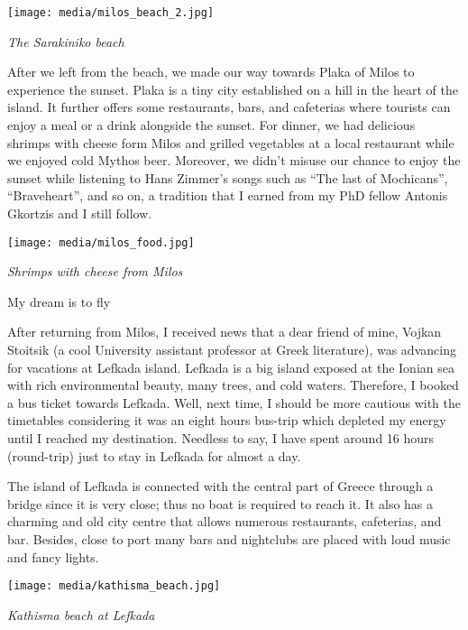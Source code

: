 \documentclass[10pt,a4paper]{article} %
\newcommand{\NewsItem}[1]{ %
\usefont{T1}{fvs}{n}{n} %
\vspace{24pt}\large #1\vspace{3pt} %
\par \normalsize \normalfont}
\begin{document}
\begin{multicols}{3}
\begin{center}
	\texttt{[image: media/milos\_beach\_2.jpg]}
	\par\textit{The Sarakiniko beach}
\end{center} 

After we left from the beach, we made our way towards Plaka of Milos
to experience the sunset. 
Plaka is a tiny city established on a hill in the heart of the island. 
It further offers some restaurants, bars, and cafeterias
where tourists can enjoy a meal or a drink alongside the sunset. 
For dinner, we had delicious shrimps with cheese form Milos
and grilled vegetables at a local restaurant while we enjoyed cold Mythos beer. 
Moreover, we didn't misuse our chance to enjoy the sunset
while listening to Hans Zimmer's songs such as ``The last of Mochicans'',
``Braveheart'', and so on,
a tradition that I earned from my PhD fellow Antonis Gkortzis and I still follow.

\begin{center}
	\texttt{[image: media/milos\_food.jpg]}
	\par\textit{Shrimps with cheese from Milos}
\end{center}

\NewsItem{My dream is to fly}
After returning from Milos, I received news that a dear friend of mine,
Vojkan Stoitsik (a cool University assistant professor at Greek literature),
was advancing for vacations at Lefkada island. 
Lefkada is a big island exposed at the Ionian sea with rich environmental beauty,
many trees, and cold waters.
Therefore, I booked a bus ticket towards Lefkada. 
Well, next time, I should be more cautious with the timetables considering
it was an eight hours bus-trip which depleted my energy until I reached my destination. 
Needless to say, I have spent around 16 hours (round-trip)
just to stay in Lefkada for almost a day. 

The island of Lefkada is connected with the central part of Greece
through a bridge since it is very close; thus no boat is required to reach it. 
It also has a charming and old city centre that allows numerous restaurants, cafeterias, and bar. 
Besides, close to port many bars and nightclubs are placed with loud music and fancy lights. 

\begin{center}
	\texttt{[image: media/kathisma\_beach.jpg]}
	\par\textit{Kathisma beach at Lefkada}
\end{center}


\end{multicols}
\end{document}
